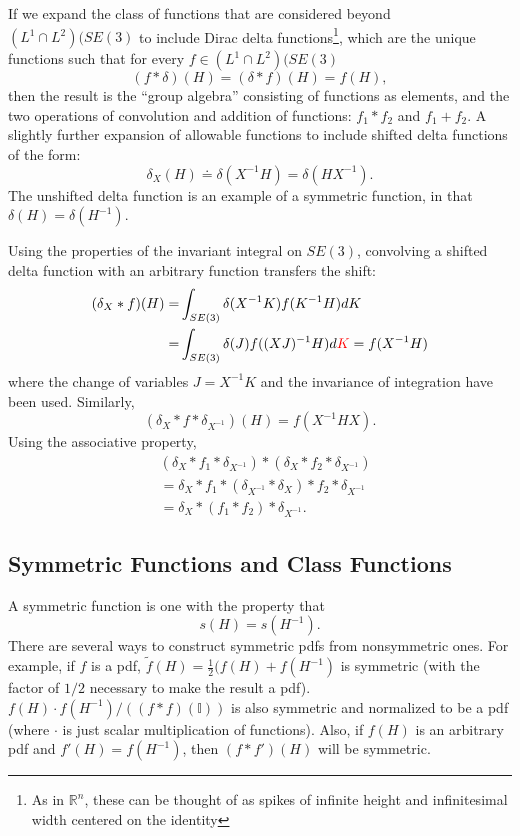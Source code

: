 \documentclass[twocolumn,10pt]{asme2ej}
\newcommand{\half}{\frac{1}{2}}
\begin{document}
If we expand the class of functions that are considered beyond $(L^1 \cap L^2)(SE(3)$
to include Dirac delta functions\footnote{As in $\mathbb{R}^n$, these can be thought of as spikes
of infinite height and infinitesimal width centered on the identity}, which are the unique functions such that for every $f \in (L^1 \cap L^2)(SE(3)$
$$ (f * \delta)(H) = (\delta * f)(H) = f(H), $$
then the result is the ``group algebra'' consisting of functions as elements, and the two operations of convolution and addition of
functions: $f_1*f_2$ and $f_1 + f_2$. A slightly further expansion of allowable functions to include shifted delta functions of the form:
$$ \delta_X(H) \doteq \delta(X^{-1} H) = \delta( H X^{-1}). $$
The unshifted delta function is an example of a symmetric function, in that $\delta(H) = \delta(H^{-1})$.

Using the properties of the invariant integral on $SE(3)$, convolving a shifted delta function with an arbitrary
function transfers the shift:
\begin{equation}
\begin{split}
(\delta_X * f)(H) =& \int_{SE(3)} \delta(X^{-1} K) f(K^{-1} H) dK \\
=& \int_{SE(3)} \delta(J) f((XJ)^{-1} H) d{\color{red}K} = f(X^{-1} H) \\
\end{split}
\end{equation}
where the change of variables $J = X^{-1} K$ and the invariance of integration have been used.
Similarly,
$$ (\delta_X * f * \delta_{X^{-1}})(H) = f(X^{-1} H X). $$
Using the associative property,
\begin{equation}
\begin{split}
&(\delta_X * f_1 * \delta_{X^{-1}}) * (\delta_X * f_2 * \delta_{X^{-1}}) \\
&= \delta_X * f_1 * (\delta_{X^{-1}} * \delta_X) * f_2 * \delta_{X^{-1}} \\ 
&= \delta_X * (f_1 * f_2)* \delta_{X^{-1}}. 
\end{split}
\end{equation}

\subsection*{Symmetric Functions and Class Functions}

A symmetric function is one with the property that
$$ s(H) = s(H^{-1}). $$
There are several ways to construct symmetric pdfs from nonsymmetric ones. For example, if $f$ is a pdf, 
$\tilde{f}(H) = \half(f(H) + f(H^{-1})$ is symmetric (with the factor of $1/2$ necessary to make the result a pdf).
$f(H)\cdot f(H^{-1})/((f*f)(\mathbb{I}))$ is also symmetric and normalized to be a pdf (where $\cdot$ is just scalar
multiplication of functions). Also, if $f(H)$ is an arbitrary pdf and $f'(H) = f(H^{-1})$, then $(f*f')(H)$ will be symmetric.
\end{document}
